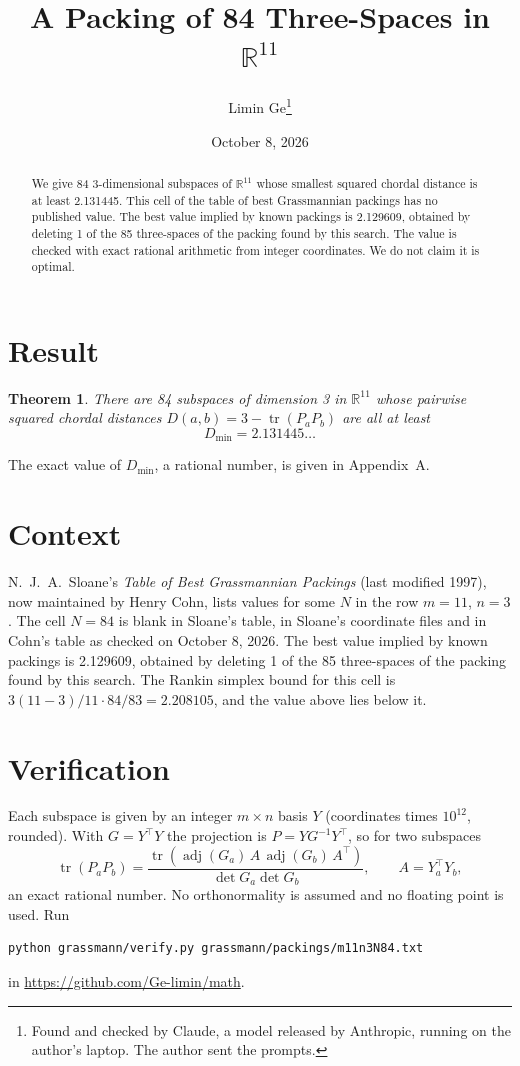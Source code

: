 \documentclass[11pt,a4paper]{article}
\title{A Packing of 84 Three-Spaces in $\mathbb{R}^{11}$}
\author{Limin Ge\thanks{Found and checked by Claude, a model released by Anthropic, running on the author's laptop. The author sent the prompts.}}
\date{October 8, 2026}
\newtheorem*{theorem}{Theorem}
\begin{document}
\maketitle
\begin{abstract}
We give 84 3-dimensional subspaces of $\mathbb{R}^{11}$ whose smallest squared chordal distance is at least 2.131445. This cell of the table of best Grassmannian packings has no published value. The best value implied by known packings is 2.129609, obtained by deleting 1 of the 85 three-spaces of the packing found by this search. The value is checked with exact rational arithmetic from integer coordinates. We do not claim it is optimal.
\end{abstract}

\section{Result}
\begin{theorem}
There are 84 subspaces of dimension 3 in $\mathbb{R}^{11}$ whose pairwise squared chordal distances $D(a,b) = 3 - \operatorname{tr}(P_aP_b)$ are all at least
\[ D_{\min} = 2.131445\ldots \]
\end{theorem}
The exact value of $D_{\min}$, a rational number, is given in Appendix~A.


\section{Context}
N.~J.~A.~Sloane's \emph{Table of Best Grassmannian Packings} (last modified 1997), now maintained by Henry Cohn, lists values for some $N$ in the row $m=11$, $n=3$. The cell $N=84$ is blank in Sloane's table, in Sloane's coordinate files and in Cohn's table as checked on October 8, 2026. The best value implied by known packings is 2.129609, obtained by deleting 1 of the 85 three-spaces of the packing found by this search. The Rankin simplex bound for this cell is $3(11-3)/11\cdot 84/83 = 2.208105$, and the value above lies below it.


\section{Verification}
Each subspace is given by an integer $m\times n$ basis $Y$ (coordinates times $10^{12}$, rounded). With $G=Y^\top Y$ the projection is $P=YG^{-1}Y^\top$, so for two subspaces
\[ \operatorname{tr}(P_aP_b)=\frac{\operatorname{tr}(\operatorname{adj}(G_a)\,A\,\operatorname{adj}(G_b)\,A^\top)}{\det G_a\det G_b},\qquad A=Y_a^\top Y_b, \]
an exact rational number. No orthonormality is assumed and no floating point is used. Run
\begin{verbatim}
python grassmann/verify.py grassmann/packings/m11n3N84.txt
\end{verbatim}
in \url{https://github.com/Ge-limin/math}.
\end{document}

